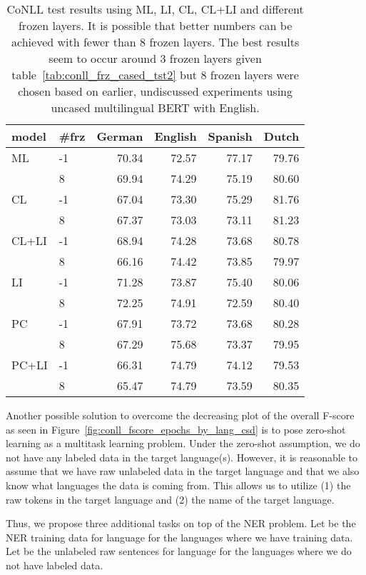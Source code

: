 \documentclass[letterpaper]{article} \usepackage{aaai20}  \usepackage{times}  \usepackage{helvet} \usepackage{courier}  \usepackage[hyphens]{url}  \usepackage{graphicx} \urlstyle{rm} \def\UrlFont{\rm}  \usepackage{graphicx}  \frenchspacing  \setlength{\pdfpagewidth}{8.5in}  \setlength{\pdfpageheight}{11in}  \usepackage{amsmath}
\begin{document}
\begin{table}
\begin{center}
\begin{tabular}{llrrrr}
\toprule
 model & \#frz &   German &   English &  Spanish & Dutch \\
\midrule
ML & -1  & 70.34 & 72.57 & 77.17 & 79.76 \\ & 8  & 69.94 & 74.29 & 75.19 & 80.60 \\      
CL & -1  & 67.04 & 73.30 & 75.29 & 81.76 \\
      &  8  & 67.37 & 73.03 & 73.11 & 81.23 \\
CL+LI & -1  & 68.94 & 74.28 & 73.68 & 80.78 \\
      &  8  & 66.16 & 74.42 & 73.85 & 79.97 \\
LI & -1  & 71.28 & 73.87 & 75.40 & 80.06 \\
      &  8  & 72.25 & 74.91 & 72.59 & 80.40 \\
PC & -1  & 67.91 & 73.72 & 73.68 & 80.28 \\
      &  8  & 67.29 & 75.68 & 73.37 & 79.95 \\
PC+LI & -1  & 66.31 & 74.79 & 74.12 & 79.53 \\
      &  8  & 65.47 & 74.79 & 73.59 & 80.35 \\
\bottomrule
\end{tabular}
\caption{CoNLL test results using ML, LI, CL, CL+LI and different
  frozen layers. It is possible that better numbers can be achieved with fewer than 8 frozen layers. The best results seem to occur around 3 frozen layers given table~\ref{tab:conll_frz_cased_tst2} but 8 frozen layers were chosen based on earlier, undiscussed experiments using uncased multilingual BERT with English.}
\label{tab:conll_exps_cased_tst2}
\end{center}
\end{table}
 
Another possible solution to overcome the decreasing plot of the overall F-score as seen in Figure~\ref{fig:conll_fscore_epochs_by_lang_csd} is to pose zero-shot learning as a multitask learning problem.
Under the zero-shot assumption, we do not have any labeled data in the target language(s). However, it is reasonable to assume that we have raw unlabeled data in the target language and that we also know what languages the data is coming from. This allows us to utilize (1) the raw tokens in the target language and (2) the name of the target language.

Thus, we propose three additional tasks on top of the NER problem.
Let  be the NER training data for language  for the  languages where we have training data. Let  be the unlabeled raw sentences for language  for the  languages where we do not have labeled data.
\end{document}
